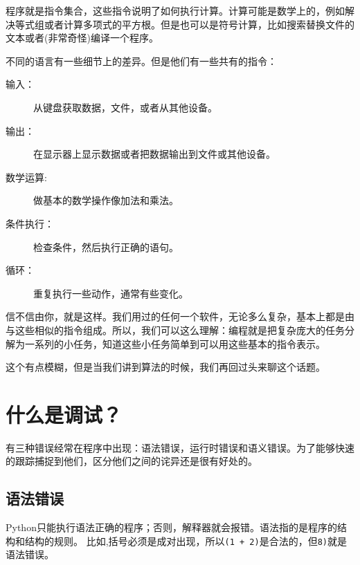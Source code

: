 \documentclass[10pt]{book}
\begin{document}
程序就是指令集合，这些指令说明了如何执行计算。计算可能是数学上的，例如解决等式组或者计算多项式的平方根。但是也可以是符号计算，比如搜索替换文件的文本或者(非常奇怪)编译一个程序。


不同的语言有一些细节上的差异。但是他们有一些共有的指令：

\begin{description}

\item[输入：] 从键盘获取数据，文件，或者从其他设备。

\item[输出：] 在显示器上显示数据或者把数据输出到文件或其他设备。

\item[数学运算:] 做基本的数学操作像加法和乘法。

\item[条件执行：]检查条件，然后执行正确的语句。

\item[循环：]重复执行一些动作，通常有些变化。

\end{description}

信不信由你，就是这样。我们用过的任何一个软件，无论多么复杂，基本上都是由与这些相似的指令组成。所以，我们可以这么理解：编程就是把复杂庞大的任务分解为一系列的小任务，知道这些小任务简单到可以用这些基本的指令表示。


这个有点模糊，但是当我们讲到算法的时候，我们再回过头来聊这个话题。

\section{什么是调试？}

有三种错误经常在程序中出现：语法错误，运行时错误和语义错误。为了能够快速的跟踪捕捉到他们，区分他们之间的诧异还是很有好处的。

\subsection{语法错误}

Python只能执行语法正确的程序；否则，解释器就会报错。语法指的是程序的结构和结构的规则。
比如,括号必须是成对出现，所以{\tt (1 + 2)}是合法的，但{\tt 8)}就是语法错误。

\end{document}

